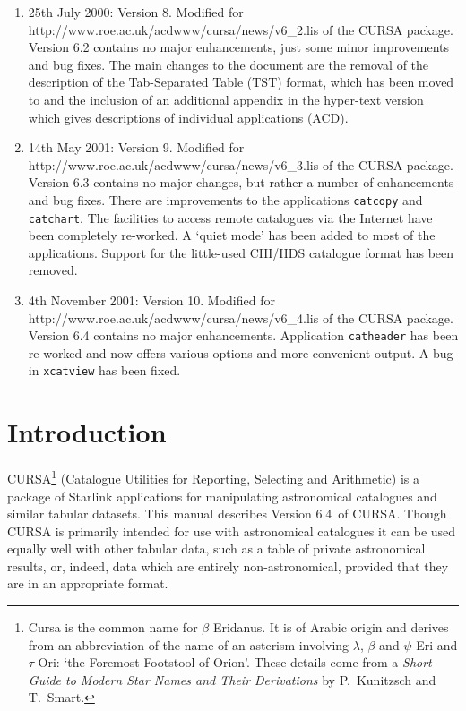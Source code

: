 \documentclass[twoside,11pt]{starlink}
\providecommand{\CURSAversion}{6.4~}
\begin{document}
\begin{enumerate}
  \item 25th July 2000: Version 8.
   Modified for 
   {http://www.roe.ac.uk/acdwww/cursa/news/v6_2.lis} of the CURSA package.
   Version 6.2 contains no major enhancements, just some minor improvements
   and bug fixes.  The main changes to the document are the removal of the
   description of the Tab-Separated Table (TST) format, which has been
   moved to  and the inclusion of an additional
   appendix in the hyper-text version which gives descriptions of individual
   applications (ACD).

  \item 14th May 2001: Version 9.
   Modified for 
   {http://www.roe.ac.uk/acdwww/cursa/news/v6_3.lis} of the CURSA package.
   Version 6.3 contains no major changes, but rather a number of
   enhancements and bug fixes.  There are improvements to the applications
   \texttt{catcopy} and \texttt{catchart}.  The facilities to access remote
   catalogues via the Internet have been completely re-worked.  A `quiet
   mode' has been added to most of the applications.  Support for the
   little-used CHI/HDS catalogue format has been removed.

  \item 4th November 2001: Version 10.
   Modified for 
   {http://www.roe.ac.uk/acdwww/cursa/news/v6_4.lis} of the CURSA package.
   Version 6.4 contains no major enhancements.  Application \texttt{catheader}
   has been re-worked and now offers various options and more convenient
   output.  A bug in \texttt{xcatview} has been fixed.

\end{enumerate}

\cleardoublepage
\newpage

\section{Introduction}

CURSA\footnote{Cursa is the common name for $\beta$ Eridanus. It is of
Arabic origin and derives from an abbreviation of the name of an
asterism involving $\lambda$, $\beta$ and $\psi$ Eri and $\tau$ Ori:
`the Foremost Footstool of Orion'.  These details come from a \textit{Short Guide to Modern Star Names and Their Derivations} by
P.~Kunitzsch and T.~Smart\cite{KUNIT}.} (Catalogue Utilities for Reporting,
Selecting and Arithmetic) is a package of Starlink applications for
manipulating astronomical catalogues and similar tabular datasets. This
manual describes Version \CURSAversion of CURSA.  Though CURSA is
primarily intended for use with astronomical catalogues it can be used
equally well with other tabular data, such as a table of private
astronomical results, or, indeed, data which are entirely non-astronomical,
provided that they are in an appropriate format.
\end{document}
